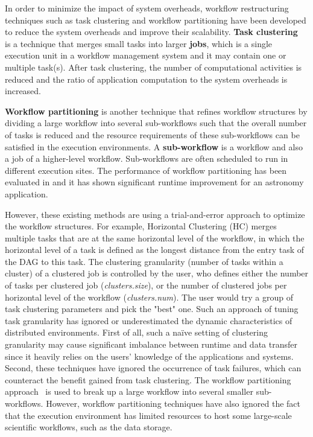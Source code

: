 In order to minimize the impact of system overheads, workflow restructuring techniques such as task clustering \cite{Singh2008,Hussin2010,Zhao2009} and workflow partitioning \cite{Kumar2002, Hedayat2009} have been developed to reduce the system overheads and improve their scalability. \textbf{Task clustering}~\cite{Singh2008} is a technique that merges small tasks into larger \textbf{jobs}, which is a single execution unit in a workflow management system and it may contain one or multiple task(s). After task clustering, the number of computational activities is reduced and the ratio of application computation to the system overheads is increased. 


\textbf{Workflow partitioning} is another technique that refines workflow structures by dividing a large workflow into several sub-workflows such that the overall number of tasks is reduced and the resource requirements of these sub-workflows can be satisfied in the execution environments. A \textbf{sub-workflow} is a workflow and also a job of a higher-level workflow. Sub-workflows are often scheduled to run in different execution sites. The performance of workflow partitioning has been evaluated in \cite{Rynge2012} and it has shown significant runtime improvement for an astronomy application. 
 
However, these existing methods are using a trial-and-error approach to optimize the workflow structures. For example, Horizontal Clustering (HC) \cite{Singh2008} merges multiple tasks that are at the same horizontal level of the workflow, in which the horizontal level of a task is defined as the longest distance from the entry task of the DAG to this task. The clustering granularity (number of tasks within a cluster) of a clustered job is controlled by the user, who defines either the number of tasks per clustered job (\textit{clusters.size}), or the number of clustered jobs per horizontal level of the workflow (\textit{clusters.num}). The user would try a group of task clustering parameters and pick the "best" one. Such an approach of tuning task granularity has ignored or underestimated the dynamic characteristics of distributed environments. First of all, such a na\"{i}ve setting of clustering granularity may cause significant imbalance between runtime and data transfer since it heavily relies on the users' knowledge of the applications and systems. Second, these techniques have ignored the occurrence of task failures, which can counteract the benefit gained from task clustering. The workflow partitioning approach~\cite{Rynge2012} is used to break up a large workflow into several smaller sub-workflows. However, workflow partitioning techniques have also ignored the fact that the execution environment has limited resources to host some large-scale scientific workflows, such as the data storage. 

